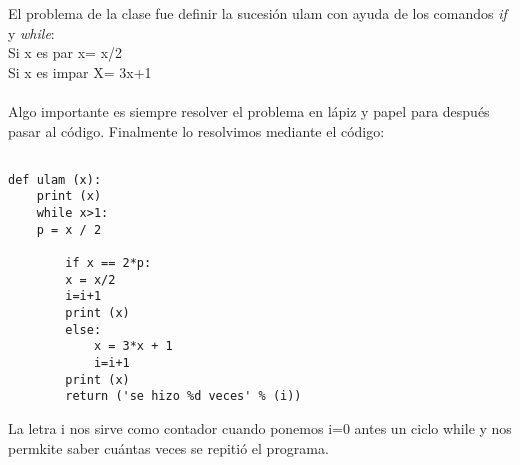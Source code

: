 \documentclass{article}
\begin{document}
El problema de la clase fue definir la sucesión ulam con ayuda de los comandos \textit{if} y \textit{while}:\\
Si x es par x= x/2\\
Si x es impar X= 3x+1 \\
\\
Algo importante es siempre resolver el problema en lápiz y papel para después pasar al código. Finalmente lo resolvimos mediante el código:
\begin{verbatim} 

def ulam (x):
	print (x)		
	while x>1:
	p = x / 2

		if x == 2*p:
		x = x/2
		i=i+1
		print (x)
		else:
			x = 3*x + 1
			i=i+1
		print (x)
		return ('se hizo %d veces' % (i))

\end{verbatim}
La letra i nos sirve como contador cuando ponemos i=0 antes un ciclo while y nos permkite saber cuántas veces se repitió el programa.\\
\end{document}
